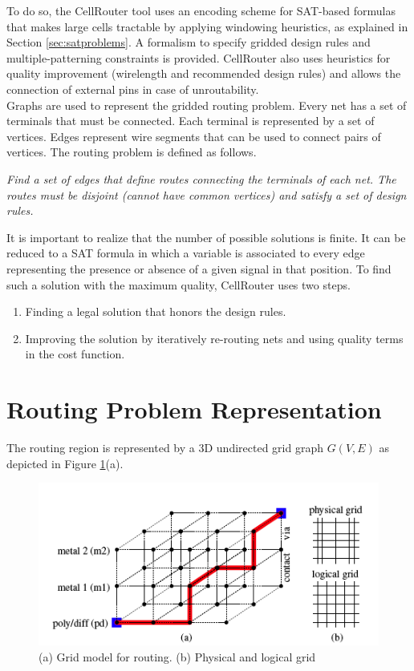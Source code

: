 To do so, the CellRouter tool uses an encoding scheme for SAT-based formulas that makes large cells tractable by applying windowing heuristics, as explained in Section \ref{sec:satproblems}. A formalism to specify gridded design rules and multiple-patterning constraints is provided. CellRouter also uses heuristics for quality improvement (wirelength and recommended design rules) and allows the connection of external pins in case of unroutability. \\

Graphs are used to represent the gridded routing problem. Every net has a set of terminals that must be connected. Each terminal is represented by a set of vertices.  Edges represent wire segments that can be used to connect pairs of vertices. The routing problem is defined as follows.

\begin{center}\textit{Find a set of edges that define routes connecting the terminals of each net. The routes must be disjoint (cannot have common vertices) and satisfy a set of design rules.}\end{center} 

It is important to realize that the number of possible solutions is finite. It can be reduced to a SAT formula in which a variable is associated to every edge representing the presence or absence of a given signal in that position. To find such a solution with the maximum quality, CellRouter uses two steps.

\begin{enumerate}
  \item Finding a legal solution that honors the design rules.
  \item Improving the solution by iteratively re-routing nets and using quality terms in the cost function.
\end{enumerate}


\section{Routing Problem Representation}

The routing region is represented by a 3D undirected grid graph $G(V,E)$ as depicted in Figure \ref{fig:grid}(a). 

\begin{figure}[h!]
  \centering
  \includegraphics[scale=0.6]{img/bckgrnd/grid.png}
  \caption{(a) Grid model for routing. (b) Physical and logical grid}
  \label{fig:grid}
\end{figure}


